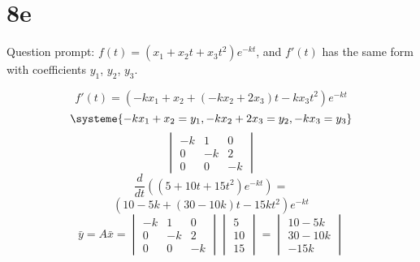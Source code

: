 \documentclass[12pt]{article}
\begin{document}
\section{8e}

Question prompt: $f(t) = (x_1 + x_2t + x_3t^2)e^{-kt}$, and $f'(t)$ has the same
form with coefficients $y_1$, $y_2$, $y_3$.

\[
  f'(t) = (-kx_1 + x_2 + (-kx_2+2x_3)t - kx_3t^2)e^{-kt}
\]
\[
  \systeme{-kx_1 + x_2 = y_1, -kx_2+2x_3 = y_2, -kx_{3} = y_3}
\]
\[
  \begin{vmatrix}
    -k & 1 & 0 \\
    0 & -k & 2 \\
    0 & 0 & -k
  \end{vmatrix}
\]
\[
  \frac{d}{dt}((5+10t+15t^2)e^{-kt}) = 
\]
\[
  (10-5k + (30-10k)t -15kt^2)e^{-kt}
\]
\medbreak{}
\[
  \bar{y} = A\bar{x} = 
  \begin{vmatrix}
    -k & 1 & 0 \\
    0 & -k & 2 \\
    0 & 0 & -k
  \end{vmatrix}
  \begin{vmatrix} 5 \\ 10 \\ 15 \end{vmatrix} = 
  \begin{vmatrix} 10-5k \\ 30-10k \\ -15k \end{vmatrix}
\]
\end{document}
